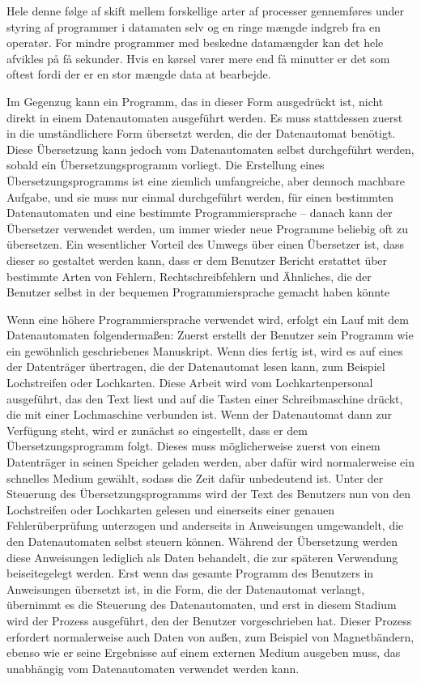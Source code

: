 {Hele denne følge af skift mellem forskellige arter af processer gennemføres under styring af programmer i datamaten selv og en ringe mængde indgreb fra en operatør. For mindre programmer med beskedne datamængder kan det hele afvikles på få sekunder. Hvis en kørsel varer mere end få minutter er det som oftest fordi der er en stor mængde data at bearbejde. 
}{
Im Gegenzug kann ein Programm, das in dieser Form ausgedrückt ist, nicht direkt in einem Datenautomaten ausgeführt werden. Es muss stattdessen zuerst in die umständlichere Form übersetzt werden, die der Datenautomat benötigt. Diese Übersetzung kann jedoch vom Datenautomaten selbst durchgeführt werden, sobald ein Übersetzungsprogramm vorliegt. Die Erstellung eines Übersetzungsprogramms ist eine ziemlich umfangreiche, aber dennoch machbare Aufgabe, und sie muss nur einmal durchgeführt werden, für einen bestimmten Datenautomaten und eine bestimmte Programmiersprache -- danach kann der Übersetzer verwendet werden, um immer wieder neue Programme beliebig oft zu übersetzen. Ein wesentlicher Vorteil des Umwegs über einen Übersetzer ist, dass dieser so gestaltet werden kann, dass er dem Benutzer Bericht erstattet über bestimmte Arten von Fehlern, Rechtschreibfehlern und Ähnliches, die der Benutzer selbst in der bequemen Programmiersprache gemacht haben könnte

Wenn eine höhere Programmiersprache verwendet wird, erfolgt ein Lauf mit dem Datenautomaten folgendermaßen: Zuerst erstellt der Benutzer sein Programm wie ein gewöhnlich geschriebenes Manuskript. Wenn dies fertig ist, wird es auf eines der Datenträger übertragen, die der Datenautomat lesen kann, zum Beispiel Lochstreifen oder Lochkarten. Diese Arbeit wird vom Lochkartenpersonal ausgeführt, das den Text liest und auf die Tasten einer Schreibmaschine drückt, die mit einer Lochmaschine verbunden ist. Wenn der Datenautomat dann zur Verfügung steht, wird er zunächst so eingestellt, dass er dem Übersetzungsprogramm folgt. Dieses muss möglicherweise zuerst von einem Datenträger in seinen Speicher geladen werden, aber dafür wird normalerweise ein schnelles Medium gewählt, sodass die Zeit dafür unbedeutend ist. Unter der Steuerung des Übersetzungsprogramms wird der Text des Benutzers nun von den Lochstreifen oder Lochkarten gelesen und einerseits  einer genauen Fehlerüberprüfung unterzogen und anderseits in Anweisungen umgewandelt, die den Datenautomaten selbst steuern können. Während der Übersetzung werden diese Anweisungen lediglich als Daten behandelt, die zur späteren Verwendung beiseitegelegt werden. Erst wenn das gesamte Programm des Benutzers in Anweisungen übersetzt ist, in die Form, die der Datenautomat verlangt, übernimmt es die Steuerung des Datenautomaten, und erst in diesem Stadium wird der Prozess ausgeführt, den der Benutzer vorgeschrieben hat. Dieser Prozess erfordert normalerweise auch Daten von außen, zum Beispiel von Magnetbändern, ebenso wie er seine Ergebnisse auf einem externen Medium ausgeben muss, das unabhängig vom Datenautomaten verwendet werden kann.

}
